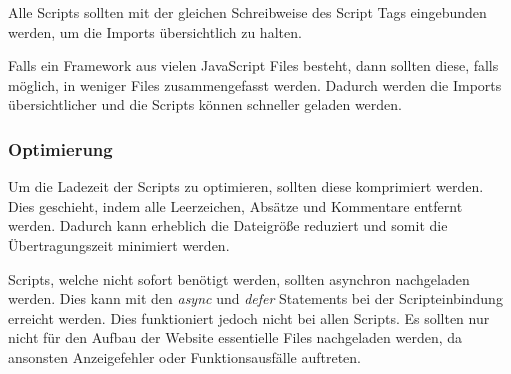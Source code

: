 Alle Scripts sollten mit der gleichen Schreibweise des Script Tags eingebunden werden, um die Imports übersichtlich zu halten. 

Falls ein Framework aus vielen JavaScript Files besteht, dann sollten diese, falls möglich, in weniger Files zusammengefasst werden. Dadurch werden die Imports übersichtlicher und die Scripts können schneller geladen werden. \cite{COMBINEJS}

\subsubsection{Optimierung}
Um die Ladezeit der Scripts zu optimieren, sollten diese komprimiert werden. Dies geschieht, indem alle Leerzeichen, Absätze und Kommentare entfernt werden. Dadurch kann erheblich die Dateigröße reduziert und somit die Übertragungszeit minimiert werden. 

Scripts, welche nicht sofort benötigt werden, sollten asynchron nachgeladen werden. Dies kann mit den \textit{async} und \textit{defer} Statements bei der Scripteinbindung erreicht werden. Dies funktioniert jedoch nicht bei allen Scripts. Es sollten nur nicht für den Aufbau der Website essentielle Files nachgeladen werden, da ansonsten Anzeigefehler oder Funktionsausfälle auftreten.